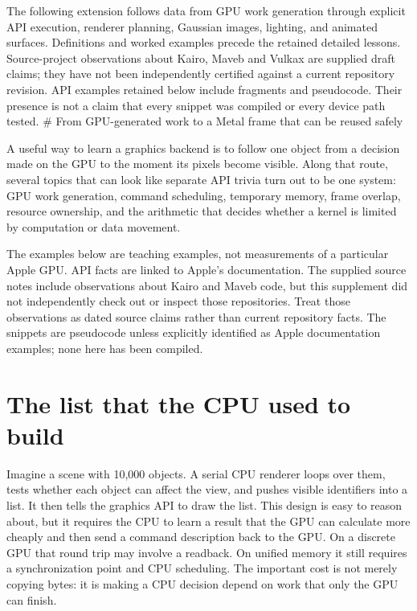 The following extension follows data from GPU work generation through explicit API execution, renderer planning, Gaussian images, lighting, and animated surfaces. Definitions and worked examples precede the retained detailed lessons. Source-project observations about Kairo, Maveb and Vulkax are supplied draft claims; they have not been independently certified against a current repository revision. API examples retained below include fragments and pseudocode. Their presence is not a claim that every snippet was compiled or every device path tested. \# From GPU-generated work to a Metal frame that can be reused safely

A useful way to learn a graphics backend is to follow one object from a decision made on the GPU to the moment its pixels become visible. Along that route, several topics that can look like separate API trivia turn out to be one system: GPU work generation, command scheduling, temporary memory, frame overlap, resource ownership, and the arithmetic that decides whether a kernel is limited by computation or data movement.

The examples below are teaching examples, not measurements of a particular Apple GPU. API facts are linked to Apple's documentation. The supplied source notes include observations about Kairo and Maveb code, but this supplement did not independently check out or inspect those repositories. Treat those observations as dated source claims rather than current repository facts. The snippets are pseudocode unless explicitly identified as Apple documentation examples; none here has been compiled.

\section{The list that the CPU used to build}\label{01-foundations-i-ch011-the-list-that-the-cpu-used-to-build}

\hypertarget{01-foundations-i-ch011-the-list-that-the-cpu-used-to-build}{}

Imagine a scene with 10,000 objects. A serial CPU renderer loops over them, tests whether each object can affect the view, and pushes visible identifiers into a list. It then tells the graphics API to draw the list. This design is easy to reason about, but it requires the CPU to learn a result that the GPU can calculate more cheaply and then send a command description back to the GPU. On a discrete GPU that round trip may involve a readback. On unified memory it still requires a synchronization point and CPU scheduling. The important cost is not merely copying bytes: it is making a CPU decision depend on work that only the GPU can finish.

